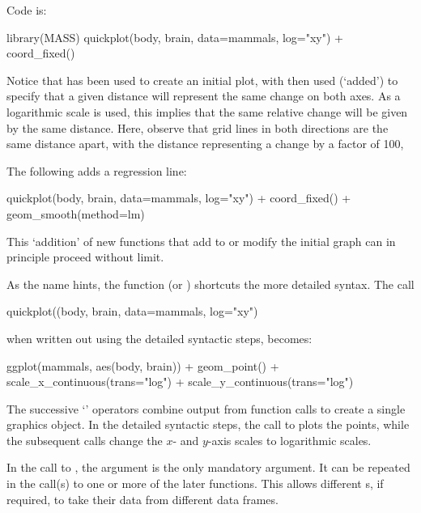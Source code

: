 \noindent Code is:
\begin{Schunk}
\begin{Sinput}
library(MASS)
quickplot(body, brain, data=mammals, log="xy") +
  coord_fixed()
\end{Sinput}
\end{Schunk}
  Notice
that  has been used to create an initial plot, with
 then used (`added') to specify that a given
distance will represent the same change on both axes.  As a
logarithmic scale is used, this implies that the same relative change
will be given by the same distance.  Here, observe that grid lines in
both directions are the same distance apart, with the distance
representing a change by a factor of 100,

The following adds a regression line:
\begin{Schunk}
\begin{Sinput}
quickplot(body, brain, data=mammals, log="xy") +
  coord_fixed() +
  geom_smooth(method=lm)
\end{Sinput}
\end{Schunk}
This `addition' of new functions that add to or modify the
initial graph can in principle proceed without limit.

As the name hints, the function  (or )
shortcuts the more detailed  syntax.  The call
\begin{Schunk}
\begin{Sinput}
quickplot((body, brain, data=mammals, log="xy")
\end{Sinput}
\end{Schunk}
when written out using the detailed syntactic steps, becomes:
\begin{Schunk}
\begin{Sinput}
ggplot(mammals, aes(body, brain)) +
  geom_point() +
  scale_x_continuous(trans="log") +
  scale_y_continuous(trans="log")
\end{Sinput}
\end{Schunk}
The successive `\code{+}' operators combine output from
function calls to create a single graphics object.  In the
detailed syntactic steps, the call to 
plots the points, while the subsequent calls change the
$x$- and $y$-axis scales to logarithmic scales.

In the call to , the  argument is the
only mandatory argument. It can be repeated in the call(s) to one
or more of the later  functions. This allows different
s, if required, to take their data from different data
frames.

